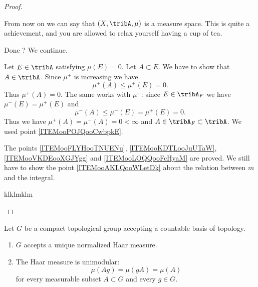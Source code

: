 \begin{proof}
\begin{subproof}
            From now on we can say that \( (X,\tribA,\mu)\) is a measure space. This is quite a achievement, and you are allowed to relax yourself having a cup of tea.

            Done ? We continue.

             
            Let \( E\in\tribA\) satisfying \( \mu(E)=0\). Let \( A\subset E\). We have to show that \( A\in\tribA\). Since \( \mu^+\) is increasing we have
            \begin{equation}
                \mu^+(A)\leq \mu^+(E)=0.
            \end{equation}
            Thus \( \mu^+(A)=0\). The same works with \( \mu^-\): since \( E\in\tribA_F\) we have \( \mu^-(E)=\mu^+(E)\) and
            \begin{equation}
                \mu^-(A)\leq \mu^-(E)=\mu^+(E)=0.
            \end{equation}
            Thus we have \( \mu^+(A)=\mu^-(A)=0<\infty\) and \( A\in \tribA_F\subset\tribA\). We used point \ref{ITEMooPOJQooCwbpkE}.

            \spitem[Summary]
             
            The points \ref{ITEMooFLYHooTNUENu}, \ref{ITEMooKDTLooJuUTaW}, \ref{ITEMooVKDEooXGJYgg} and \ref{ITEMooLOQQooFcHyaM} are proved. We still have to show the point \ref{ITEMooAKLQooWLetDk} about the relation between \( m\) and the integral.

             klklmklm

    \end{subproof}
\end{proof}



\begin{theorem} \label{ThoBZBooOTxqcI}
    Let \( G\) be a compact topological group accepting a countable basis of topology.
    \begin{enumerate}
        \item
            \( G\) accepts a unique normalized Haar measure.
        \item
            The Haar measure is unimodular:
	\begin{equation}
		\mu(Ag)=\mu(gA)=\mu(A)
	\end{equation}
    for every measurable subset \( A\subset G\) and every \( g\in G\).
    \end{enumerate}
\end{theorem}


